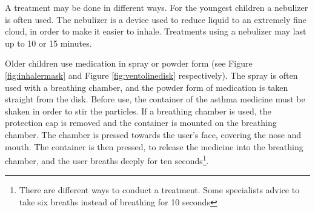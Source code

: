 A treatment may be done in different ways. For the youngest children a nebulizer is often used. The nebulizer is a device used to reduce liquid to an extremely fine cloud, in order to make it easier to inhale. Treatments using a nebulizer may last up to 10 or 15 minutes.

Older children use medication in spray or powder form (see Figure \ref{fig:inhalermask} and Figure \ref{fig:ventolinedisk} respectively). The spray is often used with a breathing chamber, and the powder form of medication is taken straight from the disk. Before use, the container of the asthma medicine must be shaken in order to stir the particles. If a breathing chamber is used, the protection cap is removed and the container is mounted on the breathing chamber. The chamber is pressed towards the user's face, covering the nose and mouth. The container is then pressed, to release the medicine into the breathing chamber, and the user breaths deeply for ten seconds\footnote{There are different ways to conduct a treatment. Some specialists advice to take six breaths instead of breathing for 10 seconds}. 

